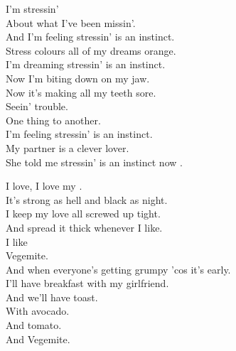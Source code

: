 
\label{album:oddments}








I'm stressin' \\
About what I've been missin'. \\
And I'm feeling stressin' is an instinct. \\
Stress colours all of my dreams orange. \\
I'm dreaming stressin' is an instinct. \\
Now I'm biting down on my jaw. \\
Now it's making all my teeth sore. \\

Seein' trouble. \\
One thing to another. \\
I'm feeling stressin' is an instinct. \\
My partner is a clever lover. \\
She told me stressin' is an instinct now . \\




I love, I love my . \\
It's strong as hell and black as night. \\
I keep my love all screwed up tight. \\
And spread it thick whenever I like. \\
I like \\
Vegemite. \\

And when everyone's getting grumpy 'cos it's early. \\
I'll have breakfast with my girlfriend. \\
And we'll have toast. \\
With avocado. \\
And tomato. \\
And Vegemite. \\

